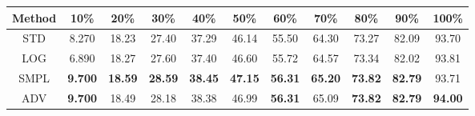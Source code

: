 \documentclass{standalone}
\begin{document}
\begin{tabular}{c|cccccccccc}
      \toprule
      Method & 10\% & 20\% & 30\% & 40\% & 50\% & 60\% & 70\% & 80\% & 90\% & 100\% \\
      \midrule
STD & 8.270 & 18.23 & 27.40 & 37.29 & 46.14 & 55.50 & 64.30 & 73.27 & 82.09 & 93.70\\
LOG & 6.890 & 18.27 & 27.60 & 37.40 & 46.60 & 55.72 & 64.57 & 73.34 & 82.02 & 93.81\\
SMPL & \textbf{9.700} & \textbf{18.59} & \textbf{28.59} & \textbf{38.45} & \textbf{47.15} & \textbf{56.31} & \textbf{65.20} & \textbf{73.82} & \textbf{82.79} & 93.71\\
ADV & \textbf{9.700} & 18.49 & 28.18 & 38.38 & 46.99 & \textbf{56.31} & 65.09 & \textbf{73.82} & \textbf{82.79} & \textbf{94.00}\\
  \bottomrule
\end{tabular}
\end{document}
